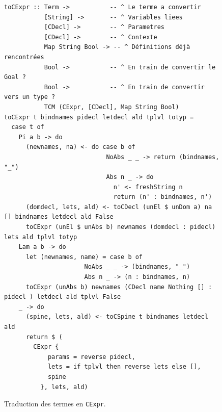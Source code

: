 \documentclass[11pt]{article}
\begin{document}
\begin{figure}[h]
\centering
\begin{verbatim}
toCExpr :: Term ->           -- ^ Le terme a convertir
           [String] ->       -- ^ Variables liees
           [CDecl] ->        -- ^ Parametres
           [CDecl] ->        -- ^ Contexte
           Map String Bool -> -- ^ Définitions déjà rencontrées
           Bool ->           -- ^ En train de convertir le Goal ?
           Bool ->           -- ^ En train de convertir vers un type ?
           TCM (CExpr, [CDecl], Map String Bool)
toCExpr t bindnames pidecl letdecl ald tplvl totyp =
  case t of
    Pi a b -> do
      (newnames, na) <- do case b of
                            NoAbs _ _ -> return (bindnames, "_")
                            Abs n _ -> do
                              n' <- freshString n
                              return (n' : bindnames, n')
      (domdecl, lets, ald) <- toCDecl (unEl $ unDom a) na [] bindnames letdecl ald False
      toCExpr (unEl $ unAbs b) newnames (domdecl : pidecl) lets ald tplvl totyp
    Lam a b -> do
      let (newnames, name) = case b of
                      NoAbs _ _ -> (bindnames, "_")
                      Abs n _ -> (n : bindnames, n)
      toCExpr (unAbs b) newnames (CDecl name Nothing [] : pidecl ) letdecl ald tplvl False
    _ -> do
      (spine, lets, ald) <- toCSpine t bindnames letdecl ald
      return $ (
        CExpr {
            params = reverse pidecl,
            lets = if tplvl then reverse lets else [],
            spine
          }, lets, ald)
\end{verbatim}
\caption{Traduction des termes en \texttt{CExpr}.}
\label{fig:agda-toCExpr}
\end{figure}
\end{document}
